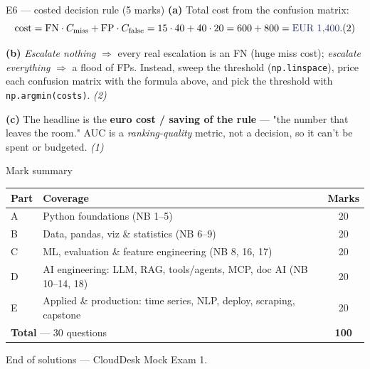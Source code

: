 \documentclass[aspectratio=169,11pt]{beamer}
\begin{document}
\begin{frame}{E6 --- costed decision rule (5 marks)}
\textbf{(a)} Total cost from the confusion matrix:
\[
\text{cost} = \text{FN}\cdot C_{\text{miss}} + \text{FP}\cdot C_{\text{false}}
            = 15\cdot 40 + 40\cdot 20 = 600 + 800 = \textcolor{hsbiblue}{\text{EUR }1{,}400}. \hfill (2)
\]

\textbf{(b)} \emph{Escalate nothing} $\Rightarrow$ every real escalation is an FN (huge miss cost);
\emph{escalate everything} $\Rightarrow$ a flood of FPs. Instead, \textcolor{cgreen}{sweep the
threshold} (\texttt{np.linspace}), price each confusion matrix with the formula above, and pick the
threshold with \texttt{np.argmin(costs)}. \hfill \emph{(2)}

\textbf{(c)} The headline is the \textbf{euro cost / saving of the rule} --- "the number that leaves
the room." AUC is a \emph{ranking-quality} metric, not a decision, so it can't be spent or
budgeted. \hfill \emph{(1)}
\end{frame}

\begin{frame}{Mark summary}
\begin{center}
\begin{tabular}{llc}
\toprule
\textbf{Part} & \textbf{Coverage} & \textbf{Marks} \\
\midrule
A & Python foundations (NB 1--5) & 20 \\
B & Data, pandas, viz \& statistics (NB 6--9) & 20 \\
C & ML, evaluation \& feature engineering (NB 8, 16, 17) & 20 \\
D & AI engineering: LLM, RAG, tools/agents, MCP, doc AI (NB 10--14, 18) & 20 \\
E & Applied \& production: time series, NLP, deploy, scraping, capstone & 20 \\
\midrule
\multicolumn{2}{l}{\textbf{Total} --- 30 questions} & \textbf{100} \\
\bottomrule
\end{tabular}
\end{center}
\vspace{0.8em}
\begin{center}\small End of solutions --- CloudDesk Mock Exam 1.\end{center}
\end{frame}
\end{document}
